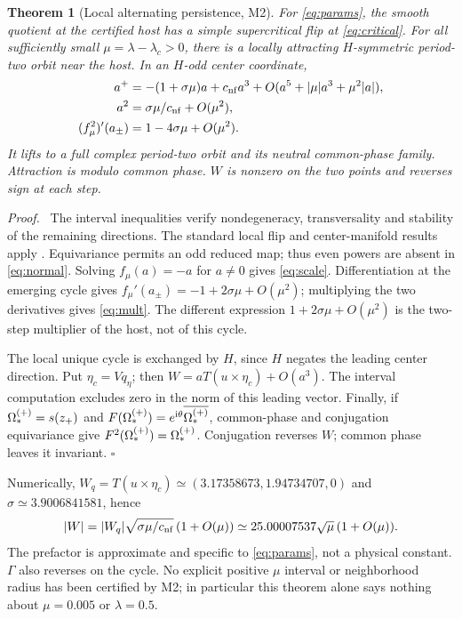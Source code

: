 \documentclass[11pt,a4paper]{article}
\newtheorem{theorem}{Theorem}\newtheorem{proposition}[theorem]{Proposition}\newtheorem{lemma}[theorem]{Lemma}
\newenvironment{proof}{\par\textit{Proof.}\ }{\hfill$\square$\par}
\begin{document}
\begin{theorem}[Local alternating persistence, M2]\label{thm:M2}
For \eqref{eq:params}, the smooth quotient at the certified host has a simple supercritical flip at \eqref{eq:critical}. For all sufficiently small $\mu=\lambda-\lambda_c>0$, there is a locally attracting $H$-symmetric period-two orbit near the host. In an $H$-odd center coordinate,
\begin{align}
 a^+&=-(1+\sigma\mu)a+c_{\rm nf}a^3
       +O(a^5+|\mu|a^3+\mu^2|a|),\label{eq:normal}\\
 a^2&=\sigma\mu/c_{\rm nf}+O(\mu^2),\label{eq:scale}\\
 (f_\mu^2)'(a_\pm)&=1-4\sigma\mu+O(\mu^2).\label{eq:mult}
\end{align}
It lifts to a full complex period-two orbit and its neutral common-phase family. Attraction is modulo common phase. $W$ is nonzero on the two points and reverses sign at each step.
\end{theorem}
\begin{proof}
The interval inequalities verify nondegeneracy, transversality and stability of the remaining directions. The standard local flip and center-manifold results apply \cite{Kuznetsov}. Equivariance permits an odd reduced map; thus even powers are absent in \eqref{eq:normal}. Solving $f_\mu(a)=-a$ for $a\ne0$ gives \eqref{eq:scale}. Differentiation at the emerging cycle gives $f_\mu'(a_\pm)=-1+2\sigma\mu+O(\mu^2)$; multiplying the two derivatives gives \eqref{eq:mult}. The different expression $1+2\sigma\mu+O(\mu^2)$ is the two-step multiplier of the host, not of this cycle.

The local unique cycle is exchanged by $H$, since $H$ negates the leading center direction. Put $\eta_c=Vq_{\eta}$; then $W=aT(u\times\eta_c)+O(a^3)$. The interval computation excludes zero in the norm of this leading vector. Finally, if $\Omega_*^{(+)}=s(z_+)$ and $F(\Omega_*^{(+)})=e^{\mathrm i\theta}\overline{\Omega_*^{(+)}}$, common-phase and conjugation equivariance give $F^2(\Omega_*^{(+)})=\Omega_*^{(+)}$. Conjugation reverses $W$; common phase leaves it invariant.
\end{proof}
Numerically, $W_q=T(u\times\eta_c)\simeq(3.17358673,1.94734707,0)$ and $\sigma\simeq3.9006841581$, hence
\begin{equation}
 |W|=|W_q|\sqrt{\sigma\mu/c_{\rm nf}}\,(1+O(\mu))
 \simeq25.00007537\sqrt\mu\,(1+O(\mu)).\label{eq:Wscale}
\end{equation}
The prefactor is approximate and specific to \eqref{eq:params}, not a physical constant. $\Gamma$ also reverses on the cycle. No explicit positive $\mu$ interval or neighborhood radius has been certified by M2; in particular this theorem alone says nothing about $\mu=0.005$ or $\lambda=0.5$.
\end{document}
